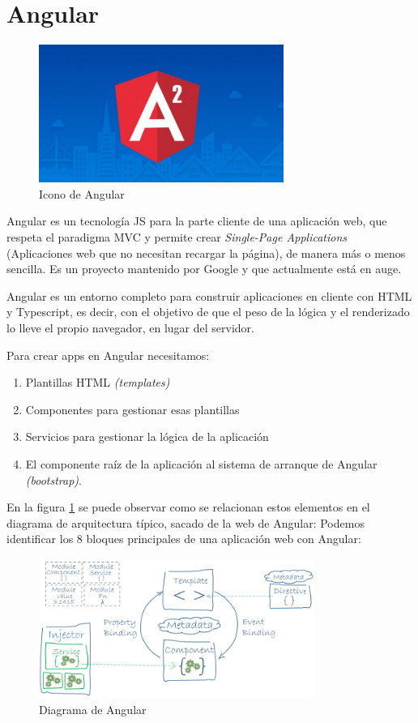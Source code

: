 \section{Angular }

\begin{figure}[!h]
    \centering
    \includegraphics[width=80mm]{img/infraestructura/a22.jpg}
    \caption{Icono de Angular}
\end{figure}


Angular \cite{angular} es un tecnología JS para la parte cliente de una aplicación web, que respeta el paradigma MVC y permite crear \textit{Single-Page Applications} (Aplicaciones web que no necesitan recargar la página), de manera más o menos sencilla. Es un proyecto mantenido por Google y que actualmente está en auge.

Angular es un entorno completo para construir aplicaciones en cliente con HTML y Typescript, es decir, con el objetivo de que el peso de la lógica y el renderizado lo lleve el propio navegador, en lugar del servidor.

Para crear apps en Angular necesitamos:

\begin{enumerate}
\item {Plantillas HTML \textit{(templates)}}
\item {Componentes para gestionar esas plantillas}
\item {Servicios para gestionar la lógica de la aplicación}
\item {El componente raíz de la aplicación al sistema de arranque de Angular \textit{(bootstrap)}.}
\end{enumerate}

En la figura \ref{img:DiagramaAngular} se puede observar como se relacionan estos elementos en el diagrama de arquitectura típico, sacado de la web de Angular:
Podemos identificar los 8 bloques principales de una aplicación web con Angular:
\begin{figure}[!h]
    \centering
    \includegraphics[width=90mm]{img/infraestructura/angular2Architecture.png}
    \caption{Diagrama de Angular}
    \label{img:DiagramaAngular}
\end{figure}



